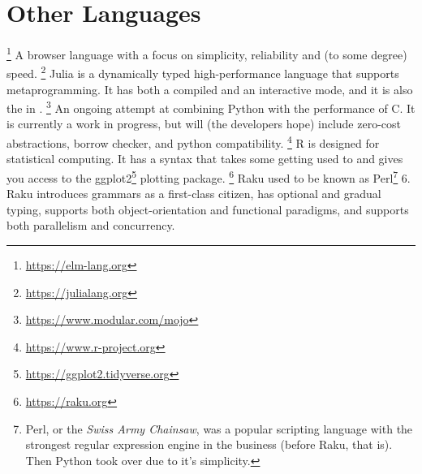 \section{Other Languages}

\begin{itemize}
  \footnote{\url{https://elm-lang.org}} A  browser language with a focus on simplicity, reliability and (to some degree) speed.
  \footnote{\url{https://julialang.org}} Julia is a dynamically typed high-performance language that supports metaprogramming. It has both a compiled and an interactive mode, and it is also the  in .
  \footnote{\url{https://www.modular.com/mojo}} An ongoing attempt at combining Python with the performance of C. It is currently a work in progress, but will (the developers hope) include zero-cost abstractions, borrow checker, and python compatibility.
  \footnote{\url{https://www.r-project.org}} R is designed for statistical computing. It has a syntax that takes some getting used to and gives you access to the ggplot2\footnote{\url{https://ggplot2.tidyverse.org}} plotting package.
  \footnote{\url{https://raku.org}} Raku used to be known as Perl\footnote{Perl, or the \textsl{Swiss Army Chainsaw}, was a popular scripting language with the strongest regular expression engine in the business (before Raku, that is). Then Python took over due to it's simplicity.} 6. Raku introduces grammars as a first-class citizen, has optional and gradual typing, supports both object-orientation and functional paradigms, and supports both parallelism and concurrency.
\end{itemize}

